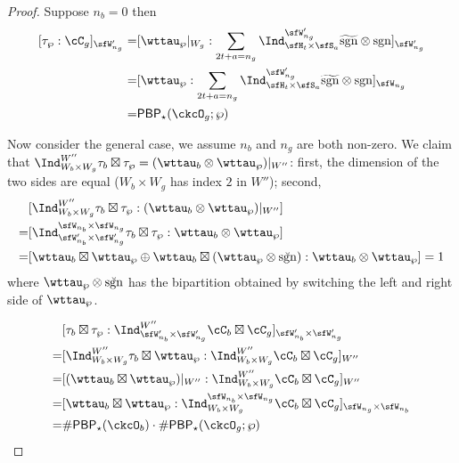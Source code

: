 \documentclass[12pt,a4paper]{amsart}
\newcommand{\sgn}{\operatorname{sgn}}
\numberwithin{equation}{section}
\theoremstyle{remark}
\def\tsgn{\widetilde{\sgn}}
\def\PBP{\mathsf{PBP}}
\def\brsgn{\breve{\sgn}}
\begin{document}
\begin{proof}
  Suppose $n_{b}=0$ then
  \[
    \begin{split}
        [\tau_{\wp} :
      \cC_{g}]_{\sfW'_{n_{g}}}
      = &
      [\wttau_{\wp}|_{W_{g}}:\sum_{2t+a=n_{g}} \Ind_{\sfH_{t}\times \sfS_{a}}^{\sfW'_{n_{g}}}\tsgn\otimes \sgn]_{\sfW'_{n_{g}}}\\
      = & [\wttau_{\wp}: \sum_{2t+a=n_{g}} \Ind_{\sfH_{t}\times \sfS_{a}}^{\sfW'_{n_{g}}}\tsgn\otimes \sgn]_{\sfW_{n_{g}}}\\
      = & \PBP_{\star}(\ckcO_{g};\wp)
    \end{split}
  \]

  Now consider the general case, we assume $n_{b}$ and $n_{g}$ are both
  non-zero. We claim that
  $\Ind_{W_{b}\times W_{g}}^{W''} \tau_{b}\boxtimes \tau_{\wp} = (\wttau_{b}\otimes \wttau_{\wp})|_{W''}$:
  first, the dimension of the two sides are equal ($W_{b}\times W_{g}$ has index
  $2$ in $W''$); second,
  \[
    \begin{split}
      &[\Ind_{W_{b}\times W_{g}}^{W''}\tau_{b}\boxtimes \tau_{\wp}:(\wttau_{b}\otimes \wttau_{\wp})|_{W''}] \\
      =& [\Ind_{\sfW'_{n_{b}}\times \sfW'_{n_{g}}}^{\sfW_{n_{b}}\times \sfW_{n_{g}}}\tau_{b}\boxtimes \tau_{\wp}:\wttau_{b}\otimes \wttau_{\wp}]\\
      =& [\wttau_{b}\boxtimes \wttau_{\wp} \oplus \wttau_{b}\boxtimes (\wttau_{\wp}\otimes \brsgn):\wttau_{b}\otimes \wttau_{\wp}] =1\\
    \end{split}
  \]
  where $\wttau_{\wp}\otimes \brsgn$ has the bipartition obtained by switching the
  left and right side of $\wttau_{\wp}$.

  \[
    \begin{split}
      &  [\tau_{b}\boxtimes \tau_{\wp} :
      \Ind_{\sfW'_{n_{b}}\times \sfW'_{n_{g}}}^{W''} \cC_{b} \boxtimes \cC_{g}]_{\sfW'_{n_{b}}\times \sfW'_{n_{g}}}\\
      = &
      [\Ind_{W_{b}\times W_{g}}^{W''} \tau_{b}\boxtimes \wttau_{\wp} :
      \Ind_{W_{b}\times W_{g}}^{W''} \cC_{b} \boxtimes \cC_{g}]_{W''}\\
      = &
      [(\wttau_{b}\boxtimes \wttau_{\wp})|_{W''}:
      \Ind_{W_{b}\times W_{g}}^{W''} \cC_{b} \boxtimes \cC_{g}]_{W''}\\
      = &
      [\wttau_{b}\boxtimes \wttau_{\wp}:
      \Ind_{W_{b}\times W_{g}}^{\sfW_{n_{b}}\times \sfW_{n_{g}}} \cC_{b} \boxtimes \cC_{g}]_{\sfW_{n_{g}}\times \sfW_{n_{b}}}\\
      =&  \# \PBP_{\star}(\ckcO_{b})\cdot \# \PBP_{\star}(\ckcO_{g};\wp)
    \end{split}
  \]


\end{proof}
\end{document}
